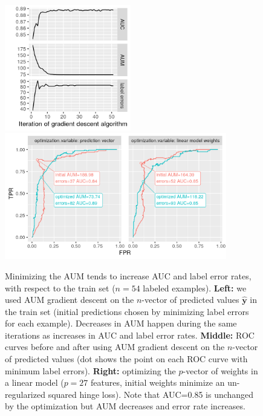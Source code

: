 \documentclass{article}
\begin{document}
\begin{figure}[ht]
\vskip 0.2in
\begin{center}
\includegraphics[height=5.5cm]{figure-aum-optimized-iterations.png}
\includegraphics[height=5.5cm]{figure-aum-train-both.png}
\vskip -0.5cm
\caption{
Minimizing the AUM tends to increase AUC and label error rates, with respect to the train set ($n=54$ labeled examples).
\textbf{Left:} we used AUM gradient descent on the $n$-vector of predicted values $\mathbf{\hat y}$ in the train set (initial predictions chosen by minimizing label errors for each example). Decreases in AUM happen during the same iterations as increases in AUC and label error rates. 
\textbf{Middle:} ROC curves before and after using AUM gradient descent on the $n$-vector of predicted values (dot shows the point on each ROC curve with minimum label errors).
\textbf{Right:} optimizing the $p$-vector of weights in a linear model ($p=27$ features, initial weights minimize an un-regularized squared hinge loss). 
Note that AUC=0.85 is unchanged by the optimization but AUM decreases and error rate increases.
}
\label{fig:aum-optimized}
\end{center}
\vskip -0.2in
\end{figure}


\end{document}
